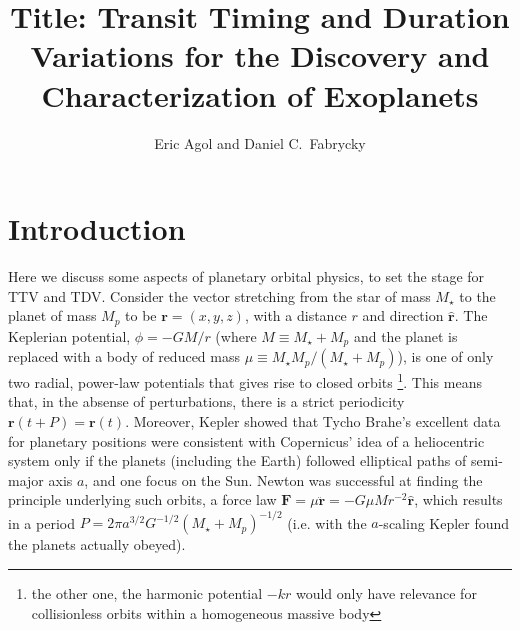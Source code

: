 \documentclass[graybox,natbib,nosecnum]{svmult}
\begin{document}
\title*{Title: Transit Timing and Duration Variations for the Discovery and Characterization of Exoplanets}
\author{Eric Agol and Daniel C.\ Fabrycky}
%
%
\maketitle



\section{Introduction}

Here we discuss some aspects of planetary orbital physics, to set the stage for TTV and TDV.  Consider the vector stretching from the star of mass $M_\star$ to the planet of mass $M_p$ to be $\mathbf{r}=(x,y,z)$, with a distance $r$ and direction $\mathbf{\hat r}$.  The Keplerian potential, $\phi=-GM/r$ (where $M \equiv M_\star + M_p$ and the planet is replaced with a body of reduced mass $\mu \equiv M_\star M_p / (M_\star+M_p)$), is one of only two radial, power-law potentials that gives rise to closed orbits \footnote{the other one, the harmonic potential $-kr$ would only have relevance for collisionless orbits within a homogeneous massive body}.  This means that, in the absense of perturbations, there is a strict periodicity $\mathbf{r}(t+P) = \mathbf{r}(t)$.  Moreover, Kepler showed that Tycho Brahe's excellent data for planetary positions were consistent with Copernicus' idea of a heliocentric system only if the planets (including the Earth) followed elliptical paths of semi-major axis $a$, and one focus on the Sun. Newton was successful at finding the principle underlying such orbits, a force law $\mathbf{F} = \mu \mathbf{\ddot r} =-G \mu M r^{-2} \mathbf{\hat r}$, which results in a period $P = 2 \pi a^{3/2} G^{-1/2} (M_\star + M_p)^{-1/2}$ (i.e. with the $a$-scaling Kepler found the planets actually obeyed).
\end{document}
